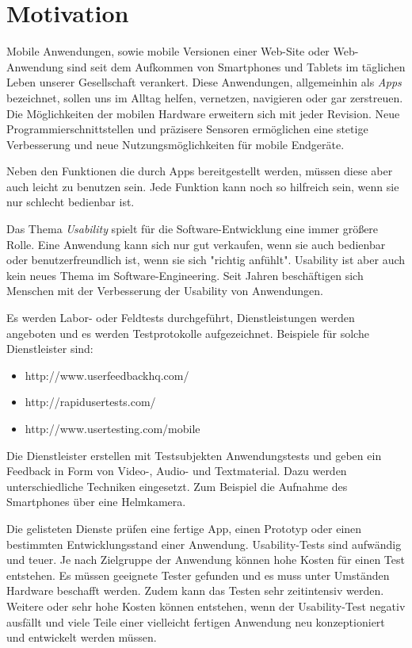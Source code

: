 \section{Motivation}
\label{motivation}

Mobile Anwendungen, sowie mobile Versionen einer Web-Site oder Web-Anwendung sind seit dem Aufkommen von Smartphones und Tablets im täglichen Leben unserer Gesellschaft verankert. Diese Anwendungen, allgemeinhin als \textit{Apps} bezeichnet, sollen uns im Alltag helfen, vernetzen, navigieren oder gar zerstreuen. Die Möglichkeiten der mobilen Hardware erweitern sich mit jeder Revision. Neue Programmierschnittstellen und präzisere Sensoren ermöglichen eine stetige Verbesserung und neue Nutzungsmöglichkeiten für mobile Endgeräte. 

Neben den Funktionen die durch Apps bereitgestellt werden, müssen diese aber auch leicht zu benutzen sein. Jede Funktion kann noch so hilfreich sein, wenn sie nur schlecht bedienbar ist. 

Das Thema \textit{Usability} spielt für die Software-Entwicklung eine immer größere Rolle. Eine Anwendung kann sich nur gut verkaufen, wenn sie auch bedienbar oder benutzerfreundlich ist, wenn sie sich "richtig anfühlt". Usability ist aber auch kein neues Thema im Software-Engineering. Seit Jahren beschäftigen sich Menschen mit der Verbesserung der Usability von Anwendungen.

Es werden Labor- oder Feldtests durchgeführt, Dienstleistungen werden angeboten und es werden Testprotokolle aufgezeichnet. Beispiele für solche Dienstleister sind: 

\begin{itemize}
    \item{http://www.userfeedbackhq.com/}
    \item{http://rapidusertests.com/}
    \item{http://www.usertesting.com/mobile}
\end{itemize}

Die Dienstleister erstellen mit Testsubjekten Anwendungstests und geben ein Feedback in Form von Video-, Audio- und Textmaterial. Dazu werden unterschiedliche Techniken eingesetzt. Zum Beispiel die Aufnahme des Smartphones über eine Helmkamera. 

Die gelisteten Dienste prüfen eine fertige App, einen Prototyp oder einen bestimmten Entwicklungsstand einer Anwendung. Usability-Tests sind aufwändig und teuer. Je nach Zielgruppe der Anwendung können hohe Kosten für einen Test entstehen. Es müssen geeignete Tester gefunden und es muss unter Umständen Hardware beschafft werden. Zudem kann das Testen sehr zeitintensiv werden. Weitere oder sehr hohe Kosten können entstehen, wenn der Usability-Test negativ ausfällt und viele Teile einer vielleicht fertigen Anwendung neu konzeptioniert und entwickelt werden müssen. 


